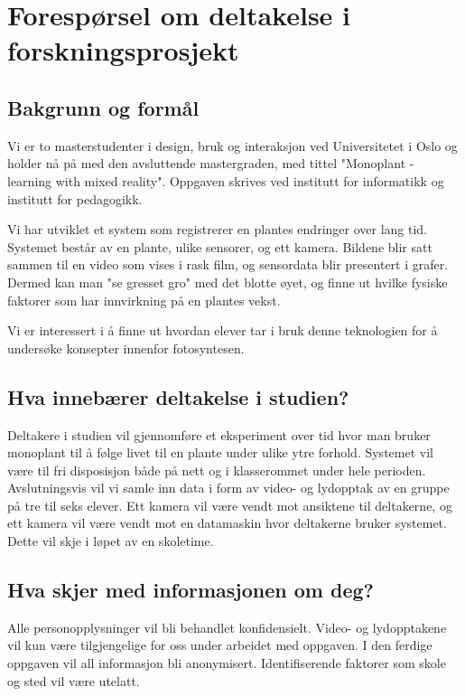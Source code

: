 


%
\section*{Forespørsel om deltakelse i forskningsprosjekt}

\subsection*{Bakgrunn og formål}
Vi er to masterstudenter i design, bruk og interaksjon ved Universitetet i Oslo og holder nå på med den avsluttende mastergraden, med tittel "Monoplant - learning with mixed reality". Oppgaven skrives ved institutt for informatikk og institutt for pedagogikk. 

Vi har utviklet et system som registrerer en plantes endringer over lang tid. Systemet består av en plante, ulike sensorer, og ett kamera. Bildene blir satt sammen til en video som vises i rask film, og sensordata blir presentert i grafer. Dermed kan man "se gresset gro" med det blotte øyet, og finne ut hvilke fysiske faktorer som har innvirkning på en plantes vekst. 

Vi er interessert i å finne ut hvordan elever tar i bruk denne teknologien for å undersøke konsepter innenfor fotosyntesen. 

\subsection*{Hva innebærer deltakelse i studien?}
Deltakere i studien vil gjennomføre et eksperiment over tid hvor man bruker monoplant til å følge livet til en plante under ulike ytre forhold. Systemet vil være til fri disposisjon både på nett og i klasserommet under hele perioden. Avslutningsvis vil vi samle inn data i form av video- og lydopptak av en gruppe på tre til seks elever. Ett kamera vil være vendt mot ansiktene til deltakerne, og ett kamera vil være vendt mot en datamaskin hvor deltakerne bruker systemet. Dette vil skje i løpet av en skoletime. 

\subsection*{Hva skjer med informasjonen om deg?}
Alle personopplysninger vil bli behandlet konfidensielt. Video- og lydopptakene vil kun være tilgjengelige for oss under arbeidet med oppgaven. I den ferdige oppgaven vil all informasjon bli anonymisert. Identifiserende faktorer som skole og sted vil være utelatt. 

